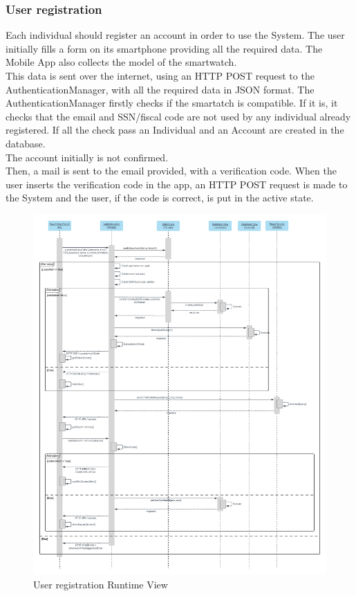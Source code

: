 \subsubsection{User registration}
Each individual should register an account in order to use the System. The user initially fills a form on its smartphone providing all the required data. The Mobile App also collects the model of the smartwatch. \\
This data is sent over the internet, using an HTTP POST request to the AuthenticationManager, with all the required data in JSON format. The AuthenticationManager firstly checks if the smartatch is compatible. If it is, it checks that the email and SSN/fiscal code are not used by any individual already registered. If all the check pass an Individual and an Account are created in the database.\\
The account initially is not confirmed.\\
Then, a mail is sent to the email provided, with a verification code.
When the user inserts the verification code in the app, an HTTP POST request is made to the System and the user, if the code is correct, is put in the active state.
\begin{figure}[H]
	\includegraphics[width=\textwidth,height=\textheight,keepaspectratio]{assets/flowCharts/IndividualRegistration.pdf}
	\caption{User registration Runtime View}
	\label{fig:IndividualRegistration}
\end{figure}



